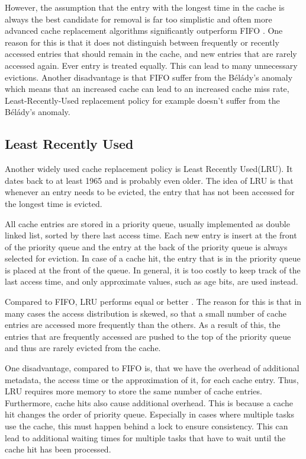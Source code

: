 \documentclass[
	12pt,
	a4paper,
	abstract,
	bibliography=totoc,
	chapterprefix,
	headings=openright,
	numbers=endperiod,
	parskip=half,
	twoside,
]{scrreprt}
\begin{document}
However, the assumption that the entry with the longest time in the cache is always the best candidate for removal is far too 
simplistic and often more advanced cache replacement algorithms significantly outperform FIFO \cite{van1992lru}.
One reason for this is that it does not distinguish between frequently or recently accessed entries that should remain in the cache, and new entries that are rarely accessed again. Ever entry is treated equally. This can lead to many unnecessary evictions.
Another disadvantage is that FIFO suffer from the Bélády's anomaly \cite{10.1145/363011.363155} which means that an increased cache can lead to an increased cache miss rate, Least-Recently-Used replacement policy for example doesn't suffer from the Bélády's anomaly.

\subsection{Least Recently Used}
Another widely used cache replacement policy is Least Recently Used(LRU).
It dates back to at least 1965 \cite{denning1980working} and is probably even older.
The idea of LRU is that whenever an entry needs to be evicted, the entry that has not been accessed for the longest time is evicted.

All cache entries are stored in a priority queue, usually implemented as double linked list, sorted by there last access time.
Each new entry is insert at the front of the priority queue and the entry at the back of the priority queue is always selected for eviction.
In case of a cache hit, the entry that is in the priority queue is placed at the front of the queue.
In general, it is too costly to keep track of the last access time, and only approximate values, such as age bits, are used instead.

Compared to FIFO, LRU performs equal or better \cite{van1992lru}.
The reason for this is that in many cases the access distribution is skewed, so that a small number of cache entries are accessed more frequently than the others.
As a result of this, the entries that are frequently accessed are pushed to the top of the priority queue and thus are rarely evicted from the cache.

One disadvantage, compared to FIFO is, that we have the overhead of additional metadata, the access time or the approximation of it, for each cache entry.
Thus, LRU requires more memory to store the same number of cache entries.
Furthermore, cache hits also cause additional overhead. 
This is because a cache hit changes the order of priority queue.
Especially in cases where multiple tasks use the cache, this must happen behind a lock to ensure consistency.
This can lead to additional waiting times for multiple tasks that have to wait until the cache hit has been processed.
\end{document}

